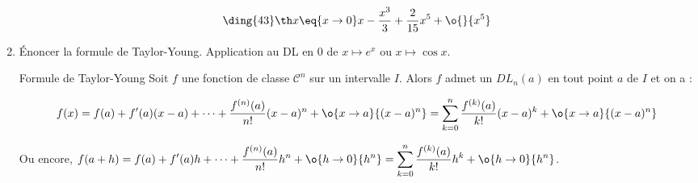 \documentclass[a4paper,french,bookmarks]{article}
\begin{document}
\begin{enumerate}
{\begin{multicols}{2}
        \[\text{\ding{43}} \th x \eq{x \to 0} x - \dfrac{x^3}{3} + \dfrac{2}{15}x^5 + \o{}{x^5}\]
        
    \end{multicols}
    
    \text{}
    
    }
    
    \item  Énoncer la formule de Taylor-Young. Application au DL en $0$ de $x \mapsto e^x$ ou $x \mapsto \cos x$.
    
    \begin{form*}{Formule de Taylor-Young}{}
        Soit $f$ une fonction de classe $\mathcal{C}^n$ sur un intervalle $I$. Alors $f$ admet un $DL_n(a)$ en tout point $a$ de $I$ et on a :
        
        \[ f(x) = f(a) + f'(a)(x-a) + \dots + \dfrac{f^{(n)}(a)}{n!}(x-a)^n + \o{x \to a}{(x-a)^n} = \sum_{k=0}^n \dfrac{f^{(k)}(a)}{k!}(x-a)^k + \o{x \to a}{(x-a)^n}\]
        
        Ou encore, $\displaystyle f(a+h)=f(a)+f'(a)h + \dots + \dfrac{f^{(n)}(a)}{n!}h^n + \o{h \to 0}{h^n} = \sum_{k=0}^n \dfrac{f^{(k)}(a)}{k!}h^k + \o{h \to 0}{h^n}$.
    \end{form*}
    
\end{enumerate}
\end{document}
